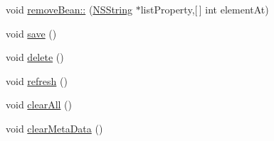 \begin{DoxyCompactItemize}
\item 
void \hyperlink{interface_mobile_bean_a6b6e69fbbc584d74a4b41c8f943405ee}{remove\-Bean\-::} (\hyperlink{class_n_s_string}{\-N\-S\-String} $\ast$list\-Property,\mbox{[}$\,$\mbox{]} int element\-At)
\item 
void \hyperlink{interface_mobile_bean_a45d21ce70f94a528516ab2a2d260c45e}{save} ()
\item 
void \hyperlink{interface_mobile_bean_a5ab770172226f0ac753ab6a77e86dacd}{delete} ()
\item 
void \hyperlink{interface_mobile_bean_aee22e60620f8758015733b09bdbd2ef6}{refresh} ()
\item 
void \hyperlink{interface_mobile_bean_a61c19b6207e6bff785cd64f28fa54204}{clear\-All} ()
\item 
void \hyperlink{interface_mobile_bean_a79f8ab8f6fc21f3724c2460b9298bb93}{clear\-Meta\-Data} ()
\end{DoxyCompactItemize}
